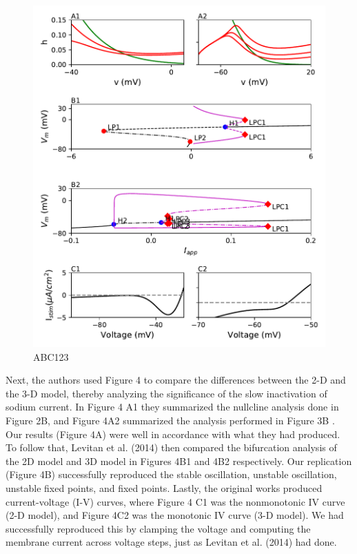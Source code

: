 \begin{figure}
	\centering
	\includegraphics[scale=0.7]{../figures/figure_4.pdf}
	\caption{ABC123}
	\label{fig:4}
\end{figure}

Next, the authors used Figure 4 to compare the differences between the 2-D and the 3-D model, thereby analyzing the significance of the slow inactivation of sodium current. In Figure 4 A1 they summarized the nullcline analysis done in Figure 2B, and Figure 4A2 summarized the analysis performed in Figure 3B . Our results (Figure 4A) were well in accordance with what they had produced. To follow that, Levitan et al. (2014) then compared the bifurcation analysis of the 2D model and 3D model in Figures 4B1 and 4B2 respectively. Our replication (Figure 4B) successfully reproduced the stable oscillation, unstable oscillation, unstable fixed points, and fixed points. Lastly, the original works produced current-voltage (I-V) curves, where Figure 4 C1 was the nonmonotonic IV curve (2-D model), and Figure 4C2 was the monotonic IV curve (3-D model). We had successfully reproduced this by clamping the voltage and computing the membrane current across voltage steps, just as Levitan et al. (2014) had done.\\ 


